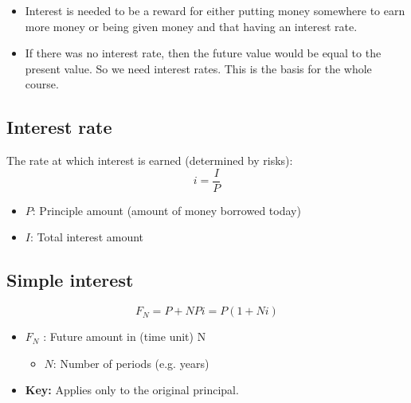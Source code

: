 \begin{intuition}
    \begin{itemize}
        \item Interest is needed to be a reward for either putting money somewhere to earn more money or being given money and that having an interest rate. 
        \item If there was no interest rate, then the future value would be equal to the present value. So we need interest rates. This is the basis for the whole course.
    \end{itemize}
\end{intuition}

\subsection{Interest rate}
\begin{definition}
    The rate at which interest is earned (determined by risks):
    \begin{equation}
        i = \frac{I}{P}
    \end{equation}
    \begin{itemize}
        \item \(P\): Principle amount (amount of money borrowed today)
        \item \(I\): Total interest amount 
    \end{itemize}
\end{definition}

\subsection{Simple interest}
\begin{definition}
    \begin{equation}
        F_N = P + NPi = P(1 + Ni)
    \end{equation}
    \begin{itemize}
        \item \(F_N\) : Future amount in (time unit) N
        \begin{itemize}
            \item \(N\): Number of periods (e.g. years)
        \end{itemize}
        \item \textbf{Key:} Applies only to the original principal.
    \end{itemize}
\end{definition}


